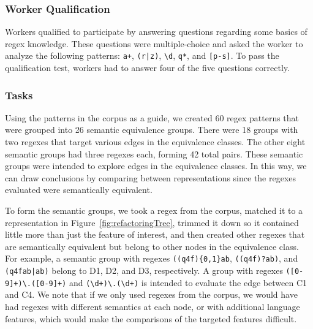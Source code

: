 \subsubsection{Worker Qualification}
Workers qualified to participate by answering questions regarding some basics of regex knowledge. These questions were multiple-choice and asked the worker to analyze the following patterns: \verb!a+!, \verb!(r|z)!, \verb!\d!, \verb!q*!, and \verb![p-s]!. To pass the qualification test, workers had to answer four of the five questions correctly.

\subsubsection{Tasks}
Using the patterns in the corpus as a guide, we created 60 regex patterns that were grouped into 26 semantic equivalence groups.
 There were 18 groups with two regexes that target various edges in the equivalence classes.
The other eight semantic groups had three regexes each, forming 42 total pairs.
These semantic groups were intended to explore edges in the equivalence classes. In this way, we can draw conclusions by comparing between representations since the regexes evaluated were semantically equivalent.

To form the semantic groups, we took a regex from the corpus, matched it to a representation in Figure~\ref{fig:refactoringTree}, trimmed it down so it contained little more than just the feature of interest, and then created other regexes that are semantically equivalent but belong to other nodes in the equivalence class. For example, a semantic group with regexes \verb!((q4f){0,1}ab!, \verb!((q4f)?ab)!, and \verb!(q4fab|ab)! belong to D1, D2, and D3, respectively.
A group with regexes \verb!([0-9]+)\.([0-9]+)! and \verb!(\d+)\.(\d+)! is intended to evaluate the edge between C1 and C4.
We note that if we only used regexes from the corpus, we would have had regexes with different semantics at each node, or with additional language features, which would make the comparisons of the targeted features difficult.




